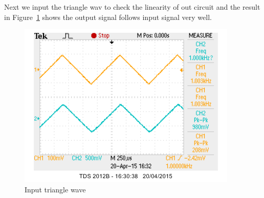 Next we input the triangle wav to check the linearity of out circuit and the result in Figure~\ref{fig:Input triangle wave} shows the output signal follows input signal very well.

\begin{figure}[htbp]
\centering
\includegraphics[scale=1]{"../Photo/Chap7/1ktriangle"}
\caption{Input triangle wave}
\label{fig:Input triangle wave}
\end{figure}
